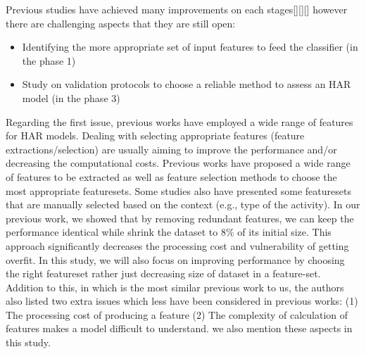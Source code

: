 \documentclass[journal,article,submit,moreauthors,pdftex]{Definitions/mdpi}
\begin{document}
Previous studies have achieved many improvements on each stages[][][] however there are challenging aspects that they are still open:
\begin{itemize}[leftmargin=*,labelsep=5.8mm]
	\item	Identifying the more appropriate set of input features to feed the classifier\cite{rosati2018comparison} (in the phase 1)
	\item	Study on validation protocols to choose a reliable method to assess an HAR model \cite{jordao2018human}(in the phase 3)
\end{itemize} 
%
Regarding the first issue, previous works have employed a wide range of features for HAR models. Dealing with selecting appropriate features (feature extractions/selection) are usually aiming to improve the performance and/or decreasing the computational costs. Previous works have proposed a wide range of features to be extracted as well as feature selection methods to choose the most appropriate featuresets. Some studies also have presented some featuresets that are manually selected based on the context (e.g., type of the activity). In our previous work\cite{Nourani_CoMoRea2019}, we showed that by removing redundant features, we can keep the performance identical while shrink the dataset to 8\% of its initial size. This approach significantly decreases the processing cost and vulnerability of getting overfit. In this study, we will also focus on improving performance by choosing the right featureset rather just decreasing size of dataset in a feature-set.\\
Addition to this, in \cite{rosati2018comparison} which is the most similar previous work to us, the authors also listed two extra issues which less have been considered in previous works:
(1) The processing cost of producing a feature
(2) The complexity of calculation of features makes a model difficult to understand.
we also mention these aspects in this study.
\end{document}
